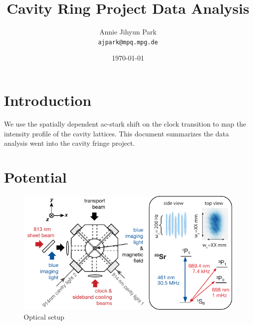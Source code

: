 \documentclass[bibnotes]{article}
\title{Cavity Ring Project Data Analysis} %
\author{Annie Jihyun Park\\ \texttt{ajpark@mpq.mpg.de}} %
\date{\today} %
\begin{document}
\maketitle %


\section*{Introduction} %

	We use the spatially dependent ac-stark shift on the clock transition to map the intensity profile of the cavity lattices. This document summarizes the data analysis went into the cavity fringe project. 

\tableofcontents

\section{Potential}

	\begin{figure}[h]
	    \centering
	    \includegraphics[]{figures/setup.pdf}
	    \caption{Optical setup}
	    \label{fig:setup}
	\end{figure}
\end{document}
